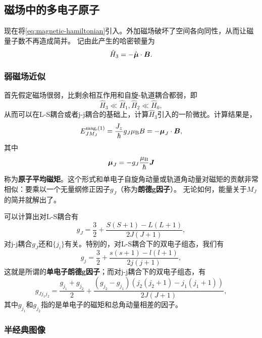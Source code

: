 \documentclass[UTF8, a4paper]{ctexart}
\begin{document}
\subsection{磁场中的多电子原子}

现在将\eqref{eq:magnetic-hamiltonian}引入。外加磁场破坏了空间各向同性，从而让磁量子数不再造成简并。
记由此产生的哈密顿量为
\begin{equation}
    \hat{H}_3 = - \hat{\vb*{\mu}} \cdot \vb*{B}.
\end{equation}

\subsubsection{弱磁场近似}

首先假定磁场很弱，比剩余相互作用和自旋-轨道耦合都弱，即
\begin{equation}
    \hat{H}_3 \ll \hat{H}_1, \hat{H}_2 \ll \hat{H}_0,
\end{equation}
从而可以在L-S耦合或者j-j耦合的基础上，计算$\hat{H}_3$引入的一阶微扰。计算结果是，
\begin{equation}
    E^{\text{mag}, (1)}_{JM_J} = \frac{J_z}{\hbar} g_J \mu_\text{B} B = - \vb*{\mu}_J \cdot \vb*{B},
\end{equation}
其中
\begin{equation}
    \vb*{\mu}_J = - g_J \frac{\mu_\text{B}}{\hbar} \vb*{J}
    \label{eq:atom-mean-magnetic}
\end{equation}
称为\textbf{原子平均磁矩}。这个形式和单电子自旋角动量或轨道角动量对磁矩的贡献非常相似：要乘以一个无量纲修正因子$g_J$（称为\textbf{朗德g因子}）。
无论如何，能量关于$M_J$的简并就解出了。

可以计算出对L-S耦合有
\begin{equation}
    g_J = \frac{3}{2} + \frac{S(S+1) - L(L+1)}{2J(J+1)},
    \label{eq:g-factor-ls}
\end{equation}
对j-j耦合$g_J$还和$\{j_i\}$有关。特别的，对L-S耦合下的双电子组态，我们有
\begin{equation}
    g_{j} = \frac{3}{2} + \frac{s(s+1) - l(l+1)}{2j(j+1)},
\end{equation}
这就是所谓的\textbf{单电子朗德g因子}；而对j-j耦合下的双电子组态，有
\begin{equation}
    g_{J j_1 j_2} = \frac{g_{j_1} + g_{j_2}}{2} + \frac{(g_{j_2} - g_{j_1})(j_2(j_2+1) - j_1(j_1+1))}{2J(J+1)},
\end{equation}
其中$g_{j_1}$和$g_{j_2}$指的是单电子的磁矩和总角动量相差的因子。

\subsubsection{半经典图像}
\end{document}

